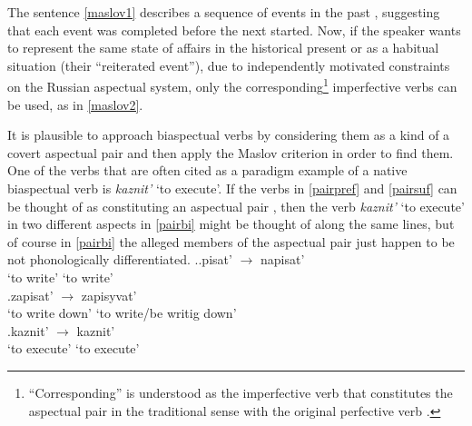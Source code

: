 The sentence \ref{maslov1} describes a sequence of events in the past , suggesting that each event was completed before the next started. Now, if the speaker wants to represent the same state of affairs in the historical present  or as a habitual situation  (their ``reiterated event''), due to independently motivated constraints on the Russian aspectual system, only the corresponding\footnote{``Corresponding'' is understood as the imperfective verb  that constitutes the aspectual pair  in the traditional sense with the original perfective verb .} imperfective verbs  can be used, as in \ref{maslov2}.

It is plausible to approach biaspectual verbs  by considering them as a kind of a covert aspectual pair  and then apply the Maslov criterion  in order to find them. One of the verbs that are often cited as a paradigm example of a native biaspectual verb   is \emph{kaznit'} `to execute'. If the verbs in \ref{pairpref} and \ref{pairsuf} can be thought of as constituting an aspectual pair , then the verb \textit{kaznit'} `to execute' in two different aspects in \ref{pairbi} might be thought of along the same lines, but of course in \ref{pairbi} the alleged members of the aspectual pair  just happen to be not phonologically differentiated.
\ex.\ag.\label{pairpref}{pisat'\textsuperscript{\IPF}} {$\rightarrow$} {napisat'\textsuperscript{\PF}}\\
{`to write'} {} {`to write'}\\
\bg.\label{pairsuf}{zapisat'\textsuperscript{\IPF}} {$\rightarrow$} {zapisyvat'\textsuperscript{\PF}}\\
{`to write down'} {} {`to write/be writig down'}\\
\bg.\label{pairbi}{kaznit'\textsuperscript{\IPF}} {$\rightarrow$} {kaznit'\textsuperscript{\PF}}\\
{`to execute'} {} {`to execute'}\\

